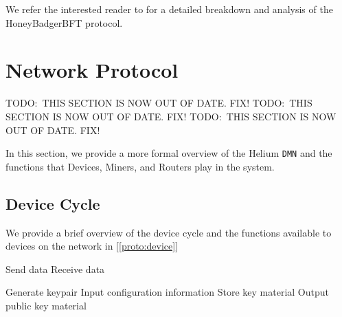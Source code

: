 \documentclass[10pt, nonatbib, nocopyrightspace, reprint]{sigplanconf}
\newcommand{\todo}[1]{}
\renewcommand{\todo}[1]{{\color{red} TODO:\ {#1}}}
\newenvironment{protocol}[2]{
  \begin{algorithm}[!htb]
    \DontPrintSemicolon
    \caption{#1}\label{#2}
}{
  \end{algorithm}
  \FloatBarrier
}
\newcommand{\protoref}[1]{[\autoref{#1}]}
\begin{document}
We refer the interested reader to \cite{honeybadger} for a detailed breakdown and analysis of the HoneyBadgerBFT protocol.

\iffalse

\section{Network Protocol}

\todo{THIS SECTION IS NOW OUT OF DATE. FIX!}
\todo{THIS SECTION IS NOW OUT OF DATE. FIX!}
\todo{THIS SECTION IS NOW OUT OF DATE. FIX!}

In this section, we provide a more formal overview of the Helium \verb|DMN| and the functions that Devices, Miners, and Routers play in the system.

\subsection{Device Cycle}

We provide a brief overview of the device cycle and the functions available to devices on the network in \protoref{proto:device}

\begin{protocol}{Device Protocol Overview}{proto:device}

   {
    Send data \;
    Receive data \;
  }

   {
    Generate keypair \;
    Input configuration information \;
    Store key material \;
    Output public key material \;
  }
\end{protocol}
\end{document}
